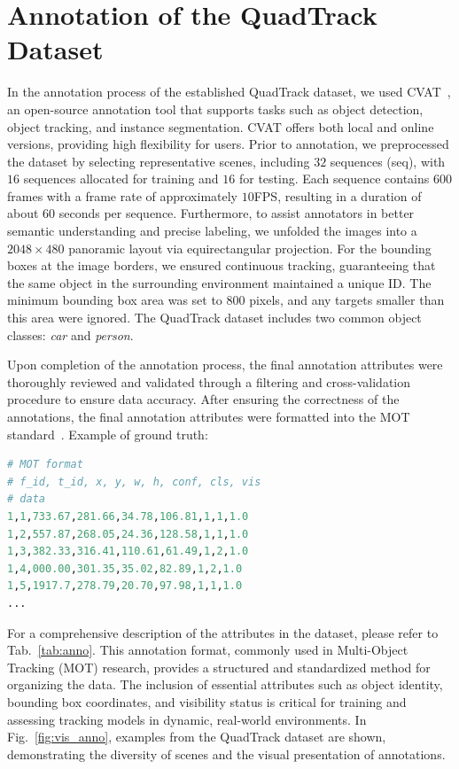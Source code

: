 \section{Annotation of the QuadTrack Dataset}

%

In the annotation process of the established QuadTrack dataset, we used CVAT~\cite{cvat}, an open-source annotation tool that supports tasks such as object detection, object tracking, and instance segmentation. CVAT offers both local and online versions, providing high flexibility for users. 
Prior to annotation, we preprocessed the dataset by selecting representative scenes, including $32$ sequences (seq), with $16$ sequences allocated for training and $16$ for testing. 
Each sequence contains $600$ frames with a frame rate of approximately $10$FPS, resulting in a duration of about $60$ seconds per sequence. 
Furthermore, to assist annotators in better semantic understanding and precise labeling, we unfolded the images into a $2048{\times}480$ panoramic layout via equirectangular projection. 
For the bounding boxes at the image borders, we ensured continuous tracking, guaranteeing that the same object in the surrounding environment maintained a unique ID. The minimum bounding box area was set to $800$ pixels, and any targets smaller than this area were ignored. 
The QuadTrack dataset includes two common object classes: \emph{car} and \emph{person}.

Upon completion of the annotation process, the final annotation attributes were thoroughly reviewed and validated through a filtering and cross-validation procedure to ensure data accuracy. After ensuring the correctness of the annotations, the final annotation attributes were formatted into the MOT standard~\cite{milan2016mot16}. 
%
Example of ground truth:


\begin{lstlisting}[language={Python}]
# MOT format
# f_id, t_id, x, y, w, h, conf, cls, vis
# data
1,1,733.67,281.66,34.78,106.81,1,1,1.0
1,2,557.87,268.05,24.36,128.58,1,1,1.0
1,3,382.33,316.41,110.61,61.49,1,2,1.0
1,4,000.00,301.35,35.02,82.89,1,2,1.0
1,5,1917.7,278.79,20.70,97.98,1,1,1.0
...
\end{lstlisting}


For a comprehensive description of the attributes in the dataset, please refer to Tab.~\ref{tab:anno}.
This annotation format, commonly used in Multi-Object Tracking (MOT) research, provides a structured and standardized method for organizing the data. 
%
The inclusion of essential attributes such as object identity, bounding box coordinates, and visibility status is critical for training and assessing tracking models in dynamic, real-world environments. 
In Fig.~\ref{fig:vis_anno}, examples from the QuadTrack dataset are shown, demonstrating the diversity of scenes and the visual presentation of annotations.

